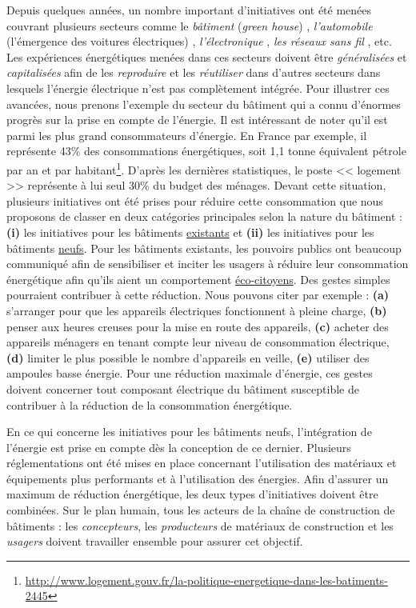 Depuis quelques années, un nombre important d'initiatives ont été menées couvrant plusieurs secteurs comme le \textit{bâtiment} (\textit{green house}) \cite{Perez08}, \textit{l'automobile} (l'émergence des voitures électriques) \cite{Tie13}, \textit{l'électronique} \cite{Barbose13}, \textit{les réseaux sans fil} \cite{Rault14}, etc. Les expériences énergétiques menées dans ces secteurs doivent être \textit{généralisées} et \textit{capitalisées} afin de les \textit{reproduire} et les \textit{réutiliser} dans d'autres secteurs dans lesquels l'énergie électrique n'est pas complètement intégrée. Pour illustrer ces avancées, nous prenons l'exemple du secteur du bâtiment qui a connu d'énormes progrès sur la prise en compte de l'énergie. Il est intéressant de noter qu'il est parmi les plus grand consommateurs d'énergie. En France par exemple, il représente 43\% des consommations énergétiques, soit 1,1 tonne équivalent pétrole par an et par habitant\footnote{\url{http://www.logement.gouv.fr/la-politique-energetique-dans-les-batiments-2445}}. D'après les dernières statistiques, le  poste << logement >> représente à lui seul 30\% du budget des ménages. Devant cette situation, plusieurs initiatives ont été prises pour réduire cette consommation que nous proposons de classer en deux catégories principales selon la nature du bâtiment : \textbf{(i)} les initiatives pour les bâtiments \underline{existants} et \textbf{(ii)} les initiatives pour les bâtiments \underline{neufs}. Pour les bâtiments existants, les pouvoirs publics ont beaucoup communiqué afin de sensibiliser et inciter les usagers à réduire leur consommation énergétique afin qu'ils aient un comportement \underline{éco-citoyens}. Des gestes simples pourraient contribuer à cette réduction. Nous pouvons citer par exemple : \textbf{(a)} s'arranger pour que les appareils électriques fonctionnent à pleine charge, \textbf{(b)} penser aux heures creuses pour la mise en route des appareils, \textbf{(c)} acheter des  appareils ménagers en tenant compte leur niveau de consommation électrique, \textbf{(d)} limiter le plus possible le nombre d'appareils en veille, \textbf{(e)} utiliser des ampoules basse énergie. Pour une réduction maximale d'énergie, ces gestes doivent concerner tout composant électrique du bâtiment susceptible de contribuer à la réduction de la consommation énergétique.  

En ce qui concerne les initiatives pour les bâtiments neufs, l'intégration de l'énergie est prise en compte dès la conception de ce dernier. Plusieurs réglementations ont été mises en place concernant l'utilisation des matériaux et équipements plus performants et à l'utilisation des énergies. Afin d'assurer un maximum de réduction énergétique, les deux types d'initiatives doivent être combinées. Sur le plan humain, tous les acteurs de la chaîne de construction de bâtiments : les \textit{concepteurs}, les \textit{producteurs} de matériaux de construction et les \textit{usagers} doivent travailler ensemble pour assurer cet objectif. 

